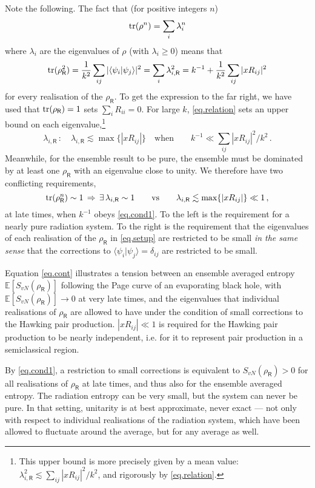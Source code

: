 \documentclass[11pt]{article}
\def\be{\begin{equation}}
\def\ee{\end{equation}}
\numberwithin{equation}{section}
\begin{document}
Note the following. The fact that (for positive integers $n$) 
\be
{\rm tr}(\rho^n)=\sum_i\lambda_i^n
\ee
where $\lambda_i$ are the eigenvalues of $\rho$ (with $\lambda_i\geq0$) means that
\be\label{eq.relation}
{\rm tr}(\rho^2_\textsf{R})=\frac{1}{k^2}\sum_{ij}|\langle\psi_i|\psi_j\rangle|^2=\sum_i\lambda_{i,\textsf{R}}^2= k^{-1}+\frac{1}{k^2}\sum_{ij}|xR_{ij}|^2
\ee
for every realisation of the $\rho_\textsf{R}$. To get the expression to the far right, we have used that ${\rm tr}(\rho_\textsf{R})=1$ sets $\sum_i R_{ii}=0$. For large $k$, \eqref{eq.relation} sets an upper bound on each eigenvalue,\footnote{This upper bound is more precisely given by a mean value: $\lambda_{i,\textsf{R}}^2\lesssim \sum_{ij}|xR_{ij}|^2/k^2$, and rigorously by \eqref{eq.relation}.}
\be\label{eq.cond1}
\lambda_{i,\textsf{R}}\,: \quad \lambda_{i,\textsf{R}} \lesssim \max\{|xR_{ij}|\}\quad\text{when}\qquad k^{-1}\ll \sum_{ij}|xR_{ij}|^2/k^2\,.
\ee
Meanwhile, for the ensemble result to be pure, the ensemble must be dominated by at least one $\rho_\textsf{R}$ with an eigenvalue close to unity. We therefore have two conflicting requirements,
\be\label{eq.cont}
{\rm tr} (\rho_\textsf{R}^n)\sim1\,\Rightarrow \,\exists\, \lambda_{i,\textsf{R}}\sim 1\qquad \text{vs}\qquad\lambda_{i,\textsf{R}} \lesssim \max\{|xR_{ij}|\}\ll1\,,
\ee
at late times, when $k^{-1}$ obeys \eqref{eq.cond1}. To the left is the requirement for a nearly pure radiation system. To the right is the requirement that the eigenvalues of each realisation of the $\rho_\textsf{R}$ in \eqref{eq.setup} are restricted to be small {\it in the same sense} that the corrections to $\langle\psi_i|\psi_j\rangle=\delta_{ij}$ are restricted to be small.

Equation \eqref{eq.cont} illustrates a tension between an ensemble averaged entropy $\mathbb{E}[S_{vN}(\rho_\textsf{R})]$ following the Page curve of an evaporating black hole, with $\mathbb{E}[S_{vN}(\rho_\textsf{R})]\rightarrow0$ at very late times, and the eigenvalues that individual realisations of $\rho_\textsf{R}$ are allowed to have under the condition of small corrections to the Hawking pair production. $|xR_{ij}|\ll1$ is required for the Hawking pair production to be nearly independent, i.e. for it to represent pair production in a semiclassical region.

By \eqref{eq.cond1}, a restriction to small corrections is equivalent to $S_{vN}(\rho_\textsf{R})>0$ for all realisations of $\rho_\textsf{R}$ at late times, and thus also for the ensemble averaged entropy. The radiation entropy can be very small, but the system can never be pure. In that setting, unitarity is at best approximate, never exact --- not only with respect to individual realisations of the radiation system, which have been allowed to fluctuate around the average, but for any average as well.
\end{document}
